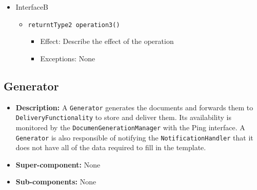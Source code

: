 \documentclass[a4paper,10pt]{article}
\begin{document}
\begin{itemize}
    \item InterfaceB
    \begin{itemize}
        \item \texttt{returntType2 operation3()}
        \begin{itemize}
            \item Effect: Describe the effect of the operation
            \item Exceptions: None
        \end{itemize}
    \end{itemize}
\end{itemize}

\subsection{Generator}
\begin{itemize}
    \item \textbf{Description:} A \texttt{Generator} generates the documents and forwards them to \texttt{DeliveryFunctionality} to store and deliver them. Its availability is monitored by the \texttt{DocumenGenerationManager} with the Ping interface. A \texttt{Generator} is also responsible of notifying the \texttt{NotificationHandler} that it does not have all of the data required to fill in the template.
    \item \textbf{Super-component:} None
    \item \textbf{Sub-components:} None
\end{itemize}
\end{document}
